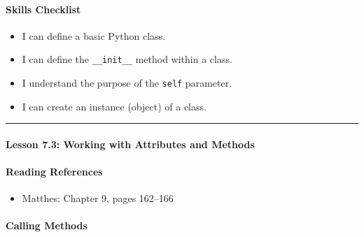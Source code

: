 \documentclass[
  justified,
  openright,
]{tufte-book}
\let\subsection\paragraph
\let\paragraph\paragraph
\let\subsection\paragraph
\let\paragraph\paragraph
\providecommand{\tightlist}{%
  \setlength{\itemsep}{0pt}\setlength{\parskip}{0pt}}
\begin{document}
\subsection{Skills Checklist}\label{skills-checklist-33}

\begin{itemize}
\tightlist
\item[$\square$]
  I can define a basic Python class.
\item[$\square$]
  I can define the \texttt{\_\_init\_\_} method within a class.
\item[$\square$]
  I understand the purpose of the \texttt{self} parameter.
\item[$\square$]
  I can create an instance (object) of a class.
\end{itemize}

\begin{center}\rule{0.5\linewidth}{0.5pt}\end{center}

\subsection{Lesson 7.3: Working with Attributes and
Methods}\label{lesson-7.3-working-with-attributes-and-methods}

\subsection{Reading References}\label{reading-references-21}

\begin{itemize}
\tightlist
\item
  Matthes: Chapter 9, pages 162--166
\end{itemize}

\subsection{Calling Methods}\label{calling-methods}
\end{document}
